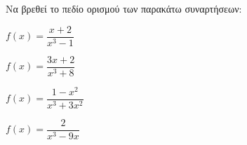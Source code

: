 Να βρεθεί το πεδίο ορισμού των παρακάτω συναρτήσεων:
\begin{alist}
\item $ f(x)=\dfrac{x+2}{x^3-1} $
\item $ f(x)=\dfrac{3x+2}{x^3+8} $
\item $ f(x)=\dfrac{1-x^2}{x^3+3x^2} $
\item $ f(x)=\dfrac{2}{x^3-9x} $
\end{alist}
